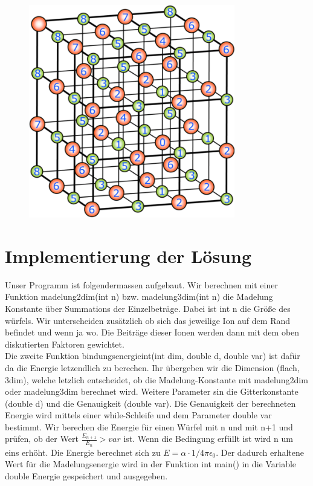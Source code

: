 \documentclass[ngerman]{scrartcl}
\begin{document}
\begin{figure}[H]
\centering\includegraphics[width=9cm]{madelung}
\end{figure}


\section*{Implementierung der Lösung}

Unser Programm ist folgendermassen aufgebaut. Wir berechnen mit einer Funktion madelung2dim(int n)  bzw. madelung3dim(int n) die Madelung Konstante über Summations der Einzelbeträge. Dabei ist int n die Größe des würfels. Wir unterscheiden zusätzlich ob sich das jeweilige Ion auf dem Rand befindet und wenn ja wo. Die Beiträge dieser Ionen werden dann mit dem oben diskutierten Faktoren gewichtet.
\\
Die zweite Funktion bindungsenergieint(int dim, double d, double var) ist dafür da die Energie letzendlich zu berechen. Ihr übergeben wir die Dimension (flach, 3dim), welche letzlich entscheidet, ob die Madelung-Konstante mit madelung2dim oder madelung3dim berechnet wird. Weitere Parameter sin die Gitterkonstante (double d) und die Genauigkeit (double var). Die Genauigkeit der berechneten Energie wird mittels einer while-Schleife und dem Parameter double var bestimmt. Wir berechen die Energie für einen Würfel mit n und mit n+1 und prüfen, ob der Wert $ \frac{E_{n+1}}{E_n} > var $ ist. Wenn die Bedingung erfüllt ist wird n um eins erhöht. Die Energie berechnet sich zu
$ E = \alpha \cdot 1/{4\pi\epsilon_0} $. Der dadurch erhaltene Wert für die Madelungsenergie wird in der Funktion int main() in die Variable double Energie gespeichert und ausgegeben.
\end{document}
